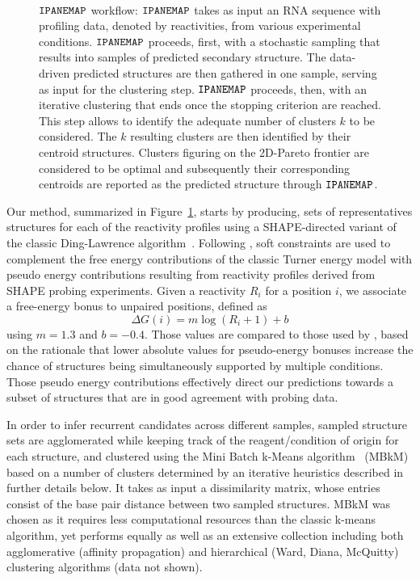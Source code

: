 \documentclass[a4,center,fleqn]{NAR}
\newcommand{\Software}[1]{$\text{\ttfamily #1}$}
\newcommand{\OurTool}{\Software{IPANEMAP}\xspace}
\newcommand{\CL}{MBkM\xspace}
\begin{document}
\begin{figure}
	{\centering\resizebox{.9\columnwidth}{!}{
			
		}\\}
	
	\caption{\OurTool{} workflow: \OurTool{} takes as input an RNA sequence with profiling data, denoted by reactivities, from various experimental conditions. \OurTool{} proceeds, first,  with a stochastic sampling that results into samples of predicted secondary structure. The data-driven predicted structures are then gathered in one sample, serving as input for the clustering step. \OurTool{} proceeds, then, with an iterative clustering that ends once the stopping criterion are reached. This step allows to identify the adequate number of clusters $k$ to be considered. The $k$ resulting clusters are then identified by their centroid structures. Clusters figuring on the 2D-Pareto frontier are considered to be optimal and subsequently their corresponding centroids are reported as the predicted structure through \OurTool.}\label{fig:approach}
\end{figure}


Our method, summarized in Figure~\ref{fig:approach}, starts by producing, sets of representatives structures for each of the reactivity profiles using a SHAPE-directed variant of the classic Ding-Lawrence algorithm~\citep{Ding2003}. Following \citet{Deigan2009}, soft constraints are used to complement the free energy contributions of the classic Turner energy model with pseudo energy contributions resulting from reactivity profiles derived from SHAPE probing experiments.  Given a reactivity $R_i$ for a position $i$, we associate a free-energy bonus to unpaired positions, defined as
$$\Delta G(i) = m \log(R_i +1 )+b$$ 
using $m=1.3$ and  $b=-0.4$. Those values are compared to those used by \citet{Deigan2009}, based on the rationale that lower absolute values for pseudo-energy bonuses increase the chance of structures being simultaneously supported by multiple conditions. Those pseudo energy contributions effectively direct our predictions towards a subset of structures that are in good agreement with probing data. 

In order to infer recurrent candidates across different samples, sampled structure sets are agglomerated while keeping track of the reagent/condition of origin for each structure, and clustered using the Mini Batch k-Means algorithm~\citep{Sculley2010} (\CL{}) based on a number of clusters determined by an iterative heuristics described in further details below. 
It takes as input a dissimilarity matrix, whose entries consist of the base pair distance between two sampled structures.
\CL{} was chosen as it requires less computational resources than the classic k-means algorithm, yet performs equally as well as an extensive collection including  both agglomerative (affinity propagation) and hierarchical (Ward, Diana, McQuitty) clustering algorithms (data not shown). 
\end{document}
